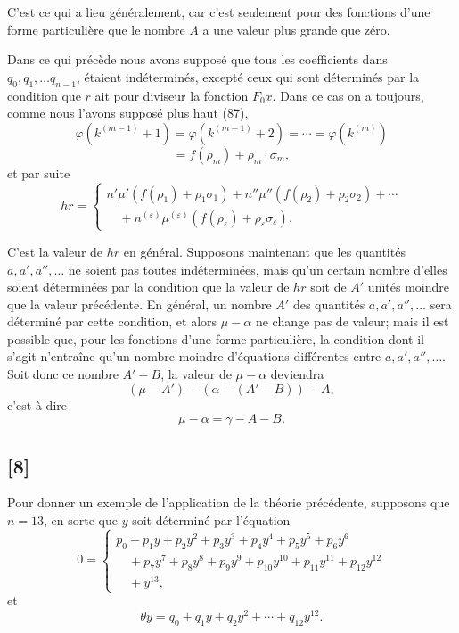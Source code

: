\documentclass{article}
\begin{document}
C'est ce qui a lieu généralement, car c'est seulement pour des fonctions d'une forme particulière que le nombre $A$ a une valeur plus grande que zéro.

Dans ce qui précède nous avons supposé que tous les coefficients dans $q_0, q_1, \ldots q_{n-1}$, étaient indéterminés, excepté ceux qui sont déterminés par la condition que $r$ ait pour diviseur la fonction $F_0 x$. Dans ce cas on a toujours, comme nous l'avons supposé plus haut (87),
\[ \varphi(k^{(m-1)}+1) = \varphi(k^{(m-1)}+2) = \cdots = \varphi(k^{(m)}) \]
\[ = f(\rho_m) + \rho_m \cdot \sigma_m, \]
et par suite
\[ hr = \begin{cases} n'\mu'\left(f(\rho_1)+\rho_1\sigma_1\right) + n''\mu''\left(f(\rho_2)+\rho_2\sigma_2\right) + \cdots \\ \quad + n^{(\varepsilon)}\mu^{(\varepsilon)}\left(f(\rho_\varepsilon)+\rho_\varepsilon\sigma_\varepsilon\right). \end{cases} \tag{106} \]

C'est la valeur de $hr$ en général. Supposons maintenant que les quantités $a, a', a'', \ldots$ ne soient pas toutes indéterminées, mais qu'un certain nombre d'elles soient déterminées par la condition que la valeur de $hr$ soit de $A'$ unités moindre que la valeur précédente. En général, un nombre $A'$ des quantités $a, a', a'', \ldots$ sera déterminé par cette condition, et alors $\mu-\alpha$ ne change pas de valeur; mais il est possible que, pour les fonctions d'une forme particulière, la condition dont il s'agit n'entraîne qu'un nombre moindre d'équations différentes entre $a, a', a'', \ldots$. Soit donc ce nombre $A'-B$, la valeur de $\mu-\alpha$ deviendra
\[ (\mu-A') - (\alpha-(A'-B)) - A, \]
c'est-à-dire
\[ \mu - \alpha = \gamma - A - B. \tag{107} \]

\subsection*{[8]}

Pour donner un exemple de l'application de la théorie précédente, supposons que $n = 13$, en sorte que $y$ soit déterminé par l'équation
\[ 0 = \begin{cases} p_0 + p_1 y + p_2 y^{2} + p_3 y^{3} + p_4 y^{4} + p_5 y^{5} + p_6 y^{6} \\ \quad + p_7 y^{7} + p_8 y^{8} + p_9 y^{9} + p_{10} y^{10} + p_{11} y^{11} + p_{12} y^{12} \\ \quad + y^{13}, \end{cases} \]
et
\[ \theta y = q_0 + q_1 y + q_2 y^{2} + \cdots + q_{12} y^{12}. \]
\end{document}
